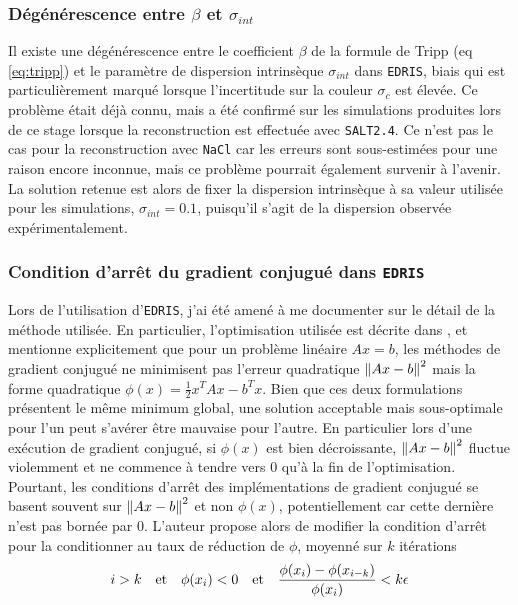 \documentclass{book}
\def\nacl{\texttt{NaCl}\xspace}
\def\edris{\texttt{EDRIS}\xspace}
\def\saltd{\texttt{SALT2.4}\xspace}
\begin{document}
\subsubsection{Dégénérescence entre $\beta$ et $\sigma_{int}$} 

Il existe une dégénérescence entre le coefficient $\beta$ de la formule de Tripp (eq \ref{eq:tripp}) et le paramètre de dispersion intrinsèque $\sigma_{int}$ dans \edris, biais qui est particulièrement marqué lorsque l'incertitude sur la couleur $\sigma_c$ est élevée. Ce problème était déjà connu, mais a été confirmé sur les simulations produites lors de ce stage lorsque la reconstruction est effectuée avec \saltd. Ce n'est pas le cas pour la reconstruction avec \nacl car les erreurs sont sous-estimées pour une raison encore inconnue, mais ce problème pourrait également survenir à l'avenir. La solution retenue est alors de fixer la dispersion intrinsèque à sa valeur utilisée pour les simulations, $\sigma_{int} = 0.1$, puisqu'il s'agit de la dispersion observée expérimentalement.

\subsubsection{Condition d'arrêt du gradient conjugué dans \edris}

Lors de l'utilisation d'\edris, j'ai été amené à me documenter sur le détail de la méthode utilisée. En particulier, l'optimisation utilisée est décrite dans \cite{martens_deep_2010}, et mentionne explicitement que pour un problème linéaire $Ax = b$, les méthodes de gradient conjugué ne minimisent pas l'erreur quadratique $\norm{Ax-b}^2$ mais la forme quadratique $\phi(x) = \frac{1}{2} x^T A x - b^T x$. Bien que ces deux formulations présentent le même minimum global, une solution acceptable mais sous-optimale pour l'un peut s'avérer être mauvaise pour l'autre. En particulier lors d'une exécution de gradient conjugué, si $\phi(x)$ est bien décroissante, $\norm{Ax-b}^2$ fluctue violemment et ne commence à tendre vers 0 qu'à la fin de l'optimisation. Pourtant, les conditions d'arrêt des implémentations de gradient conjugué se basent souvent sur $\norm{Ax-b}^2$ et non $\phi(x)$, potentiellement car cette dernière n'est pas bornée par 0. L'auteur propose alors de modifier la condition d'arrêt pour la conditionner au taux de réduction de $\phi$, moyenné sur $k$ itérations
\begin{equation}
	i > k \qq{et} \phi(x_i) < 0 \qq{et} \frac{\phi(x_i) - \phi(x_{i-k})}{\phi(x_i)} < k \epsilon
\end{equation}
\end{document}
